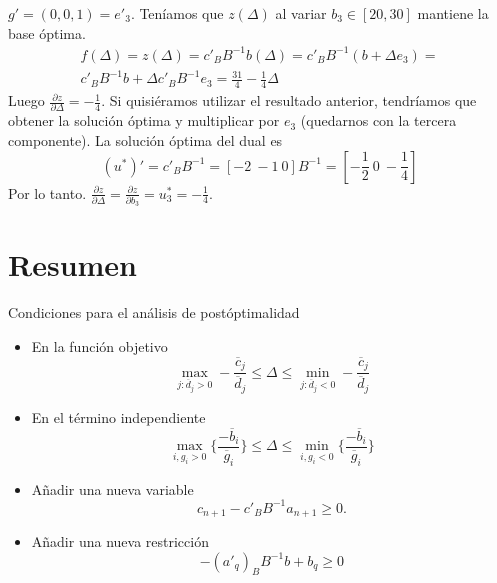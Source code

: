 \documentclass[PM.tex]{subfiles}
\begin{document}
\begin{example}
$g'=(0,0,1)=e'_3$. Teníamos que $z(\Delta)$ al variar $b_3\in [20,30]$ mantiene la base óptima.
\begin{gather*}
f(\Delta)= z(\Delta)=c'_B B^{-1}b(\Delta)=c'_B B^{-1}(b+\Delta e_3)=\\
c'_B B^{-1} b +\Delta c'_B B^{-1} e_3 =\frac{31}{4}-\frac{1}{4}\Delta
\end{gather*}
Luego $\frac{\partial z}{\partial\Delta}=-\frac{1}{4}$. Si quisiéramos utilizar el resultado anterior, tendríamos que obtener la solución óptima y multiplicar por $e_3$ (quedarnos con la tercera componente). La solución óptima del dual es
\[(u^*)'=c'_B B^{-1}=[-2\ -1\ 0]B^{-1}=[-\frac{1}{2}\ 0\ -\frac{1}{4}]\]
Por lo tanto. $\frac{\partial z}{\partial\Delta}=\frac{\partial z}{\partial b_3}=u^*_3=-\frac{1}{4}$.
\end{example}
\newpage
\section{Resumen}
Condiciones para el análisis de postóptimalidad
\begin{itemize}
\item En la función objetivo
\[
\max_{j:\overline{d}_j >0}-\frac{\overline{c}_j}{\overline{d}_j} \leq \Delta \leq \min_{j:\overline{d}_j <0}-\frac{\overline{c}_j}{\overline{d}_j}
\]
\item En el término independiente
\[\max_{i, g_i>0}\{\frac{-\overline{b}_i}{\overline{g}_i}\}\leq\Delta \leq \min_{i,g_i<0}\{\frac{-\overline{b}_i}{\overline{g}_i}\}\]
\item Añadir una nueva variable
\[c_{n+1}-c'_B B^{-1} a_{n+1}\geq 0.\]
\item Añadir una nueva restricción
\[-(a'_q)_B B^{-1}b+b_q\geq 0\]
\end{itemize}



\end{document}
